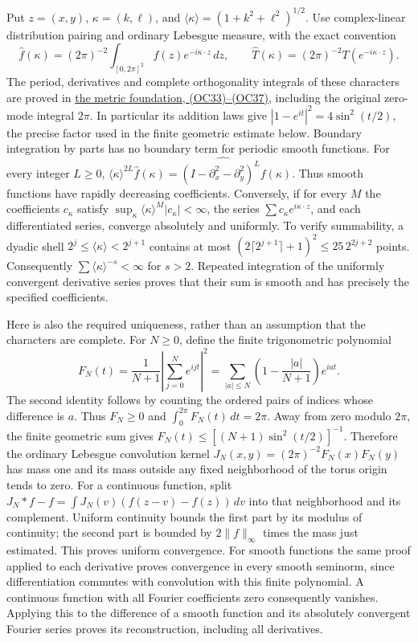 \documentclass[
  11pt,
]{article}
\begin{document}
Put \(z=(x,y)\), \(\kappa=(k,\ell)\), and
\(\langle\kappa\rangle=(1+k^2+\ell^2)^{1/2}\). Use complex-linear
distribution pairing and ordinary Lebesgue measure, with the exact
convention \[
 \widehat f(\kappa)=(2\pi)^{-2}\int_{[0,2\pi]^2}
       f(z)e^{-i\kappa\cdot z}\,dz,
 \qquad
 \widehat T(\kappa)=(2\pi)^{-2}T(e^{-i\kappa\cdot z}).
 \tag{AE1}
\] The period, derivatives and complete orthogonality integrals of these
characters are proved in
\href{metric-foundation-bridges.pdf\#section*.122}{the
metric foundation, (OC33)--(OC37)}, including the original zero-mode
integral \(2\pi\). In particular its addition laws give
\(|1-e^{it}|^2=4\sin^2(t/2)\), the precise factor used in the finite
geometric estimate below. Boundary integration by parts has no boundary
term for periodic smooth functions. For every integer \(L\geq0\),
\(\langle\kappa\rangle^{2L}\widehat f(\kappa)
=\widehat{(I-\partial_x^2-\partial_y^2)^L f}(\kappa)\). Thus smooth
functions have rapidly decreasing coefficients. Conversely, if for every
\(M\) the coefficients \(c_\kappa\) satisfy
\(\sup_\kappa\langle\kappa\rangle^M|c_\kappa|<\infty\), the series
\(\sum c_\kappa e^{i\kappa\cdot z}\), and each differentiated series,
converge absolutely and uniformly. To verify summability, a dyadic shell
\(2^j\leq\langle\kappa\rangle<2^{j+1}\) contains at most
\((2\lceil2^{j+1}\rceil+1)^2\leq25\,2^{2j+2}\) points. Consequently
\(\sum\langle\kappa\rangle^{-s}<\infty\) for \(s>2\). Repeated
integration of the uniformly convergent derivative series proves that
their sum is smooth and has precisely the specified coefficients.

Here is also the required uniqueness, rather than an assumption that the
characters are complete. For \(N\geq0\), define the finite trigonometric
polynomial \[
 F_N(t)=\frac1{N+1}\left|\sum_{j=0}^N e^{ijt}\right|^2
  =\sum_{|a|\leq N}\left(1-\frac{|a|}{N+1}\right)e^{iat}.
 \tag{AE2}
\] The second identity follows by counting the ordered pairs of indices
whose difference is \(a\). Thus \(F_N\geq0\) and
\(\int_0^{2\pi}F_N(t)\,dt=2\pi\). Away from zero modulo \(2\pi\), the
finite geometric sum gives \(F_N(t)\leq[(N+1)\sin^2(t/2)]^{-1}\).
Therefore the ordinary Lebesgue convolution kernel
\(J_N(x,y)=(2\pi)^{-2}F_N(x)F_N(y)\) has mass one and its mass outside
any fixed neighborhood of the torus origin tends to zero. For a
continuous function, split \(J_N*f-f=\int J_N(v)(f(z-v)-f(z))\,dv\) into
that neighborhood and its complement. Uniform continuity bounds the
first part by its modulus of continuity; the second part is bounded by
\(2\|f\|_\infty\) times the mass just estimated. This proves uniform
convergence. For smooth functions the same proof applied to each
derivative proves convergence in every smooth seminorm, since
differentiation commutes with convolution with this finite polynomial. A
continuous function with all Fourier coefficients zero consequently
vanishes. Applying this to the difference of a smooth function and its
absolutely convergent Fourier series proves its reconstruction,
including all derivatives.
\end{document}
